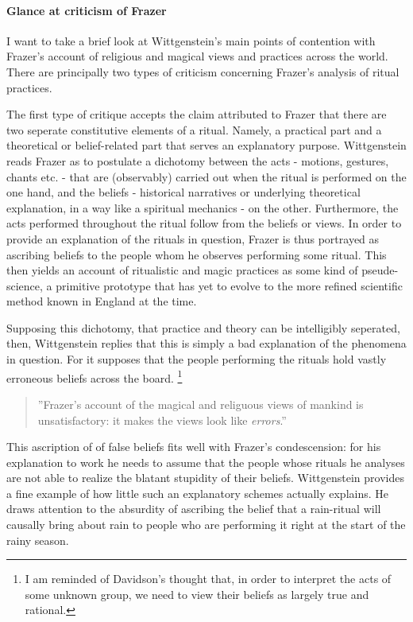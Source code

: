 \documentclass{article}
\begin{document}
\paragraph{Glance at criticism of Frazer}
I want to take a brief look at Wittgenstein's main points of contention with Frazer's account of religious and magical views and practices across the world. There are principally two types of criticism concerning Frazer's analysis of ritual practices. 

The first type of critique accepts the claim attributed to Frazer that there are two seperate constitutive elements of a ritual. Namely, a practical part and a theoretical or belief-related part that serves an explanatory purpose. Wittgenstein reads Frazer as to postulate a dichotomy between the acts - motions, gestures, chants etc. - that are (observably) carried out when the ritual is performed on the one hand, and the beliefs - historical narratives or underlying theoretical explanation, in a way like a spiritual mechanics - on the other. Furthermore, the acts performed throughout the ritual follow from the beliefs or views. In order to provide an explanation of the rituals in question, Frazer is thus portrayed as ascribing beliefs to the people whom he observes performing some ritual. This then yields an account of ritualistic and magic practices as some kind of pseude-science, a primitive prototype that has yet to evolve to the more refined scientific method known in England at the time. 

Supposing this dichotomy, that practice and theory can be intelligibly seperated, then, Wittgenstein replies that this is simply a bad explanation of the phenomena in question. For it supposes that the people performing the rituals hold vastly erroneous beliefs across the board. \footnote{I am reminded of Davidson's thought that, in order to interpret the acts of some unknown group, we need to view their beliefs as largely true and rational.}
\begin{quote}
''Frazer's account of the magical and religuous views of mankind is unsatisfactory: it makes the views look like \textit{errors}.''
\end{quote} %
This ascription of of false beliefs fits well with Frazer's condescension: for his explanation to work he needs to assume that the people whose rituals he analyses are not able to realize the blatant stupidity of their beliefs. Wittgenstein provides a fine example of how little such an explanatory schemes actually explains. He draws attention to the absurdity of ascribing the belief that a rain-ritual will causally bring about rain to people who are performing it right at the start of the rainy season.
\end{document}
